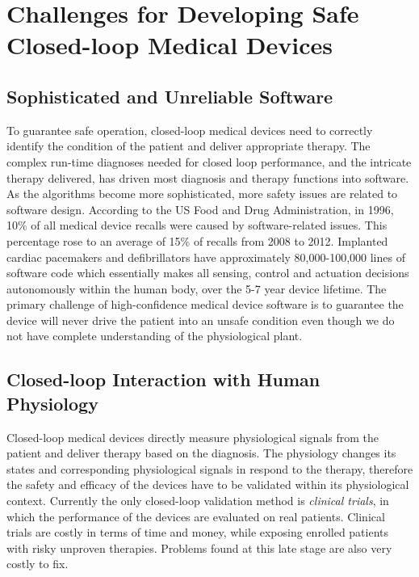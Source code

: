 \documentclass[a4paper]{article}
\begin{document}
\section{Challenges for Developing Safe Closed-loop Medical Devices}
\subsection{Sophisticated and Unreliable Software}
To guarantee safe operation, closed-loop medical devices need to correctly identify the condition of the patient and deliver appropriate therapy.
The complex run-time diagnoses needed for closed loop performance, and the intricate therapy delivered, has driven most diagnosis and therapy functions into software.
As the algorithms become more sophisticated, more safety issues are related to software design. 
According to the US Food and Drug Administration, in 1996, 10\% of all medical device recalls were caused by software-related issues. 
This percentage rose to an average of 15\% of recalls from 2008 to 2012. 
Implanted cardiac pacemakers and defibrillators have approximately 80,000-100,000 lines of software code which essentially makes all sensing, control and actuation decisions autonomously within the human body, over the 5-7 year device lifetime. 
The primary challenge of high-confidence medical device software is to guarantee the device will never drive the patient into an unsafe condition even though we do not have complete understanding of the physiological plant.  
\subsection{Closed-loop Interaction with Human Physiology}
Closed-loop medical devices directly measure physiological signals from the patient and deliver therapy based on the diagnosis.
The physiology changes its states and corresponding physiological signals in respond to the therapy, therefore the safety and efficacy of the devices have to be validated within its physiological context.
Currently the only closed-loop validation method is \emph{clinical trials}, in which the performance of the devices are evaluated on real patients.
Clinical trials are costly in terms of time and money, while exposing enrolled patients with risky unproven therapies.
Problems found at this late stage are also very costly to fix.
\end{document}
